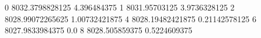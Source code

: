 0 8032.3798828125 4.396484375
1 8031.95703125 3.9736328125
2 8028.99072265625 1.00732421875
4 8028.19482421875 0.21142578125
6 8027.9833984375 0.0
8 8028.505859375 0.5224609375
